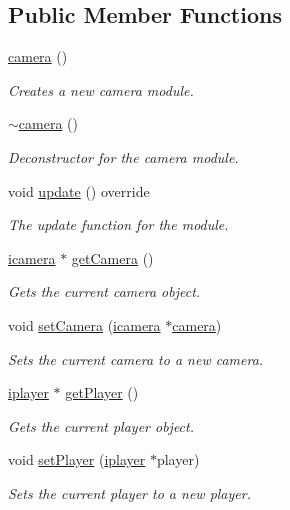 \subsection*{Public Member Functions}
\begin{DoxyCompactItemize}
\item 
\hyperlink{classflounder_1_1camera_a84e93f21953c21facbcddf77d83c7c47}{camera} ()
\begin{DoxyCompactList}\small\item\em Creates a new camera module. \end{DoxyCompactList}\item 
\hyperlink{classflounder_1_1camera_ada55d236f9f9b9a301b3fd747d15d4d0}{$\sim$camera} ()
\begin{DoxyCompactList}\small\item\em Deconstructor for the camera module. \end{DoxyCompactList}\item 
void \hyperlink{classflounder_1_1camera_a6b2da3a1c348764d3cf954db5ac5b357}{update} () override
\begin{DoxyCompactList}\small\item\em The update function for the module. \end{DoxyCompactList}\item 
\hyperlink{classflounder_1_1icamera}{icamera} $\ast$ \hyperlink{classflounder_1_1camera_abc16dba0c44428f99ce65af2c1dac5b8}{get\+Camera} ()
\begin{DoxyCompactList}\small\item\em Gets the current camera object. \end{DoxyCompactList}\item 
void \hyperlink{classflounder_1_1camera_a43117513a5beffafb902448843206a79}{set\+Camera} (\hyperlink{classflounder_1_1icamera}{icamera} $\ast$\hyperlink{classflounder_1_1camera}{camera})
\begin{DoxyCompactList}\small\item\em Sets the current camera to a new camera. \end{DoxyCompactList}\item 
\hyperlink{classflounder_1_1iplayer}{iplayer} $\ast$ \hyperlink{classflounder_1_1camera_a662d47759c3b570def49a75981b95bc4}{get\+Player} ()
\begin{DoxyCompactList}\small\item\em Gets the current player object. \end{DoxyCompactList}\item 
void \hyperlink{classflounder_1_1camera_aa572fb3c1428b8a69aba9e9944405c5c}{set\+Player} (\hyperlink{classflounder_1_1iplayer}{iplayer} $\ast$player)
\begin{DoxyCompactList}\small\item\em Sets the current player to a new player. \end{DoxyCompactList}\end{DoxyCompactItemize}
